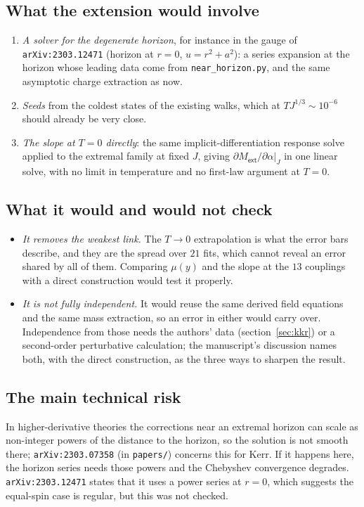 \documentclass[11pt,a4paper]{article}
\newcommand{\q}[1]{\subsection*{\color{accent}#1}}
\newcommand{\ext}{\mathsf{ext}}
\begin{document}
\q{What the extension would involve}

\begin{enumerate}\itemsep3pt
  \item \emph{A solver for the degenerate horizon}, for instance in the gauge of
  \texttt{arXiv:2303.12471} (horizon at $r=0$, $u=r^2+a^2$): a series expansion
  at the horizon whose leading data come from \texttt{near\_horizon.py}, and the
  same asymptotic charge extraction as now.
  \item \emph{Seeds} from the coldest states of the existing walks, which at
  $TJ^{1/3}\sim10^{-6}$ should already be very close.
  \item \emph{The slope at $T=0$ directly}: the same implicit-differentiation
  response solve applied to the extremal family at fixed $J$, giving
  $\partial M_\ext/\partial\alpha|_J$ in one linear solve, with no limit in
  temperature and no first-law argument at $T=0$.
\end{enumerate}

\q{What it would and would not check}

\begin{itemize}\itemsep3pt
  \item \emph{It removes the weakest link.} The $T\to0$ extrapolation is what
  the error bars describe, and they are the spread over $21$ fits, which cannot
  reveal an error shared by all of them. Comparing $\mu(y)$ and the slope at the
  $13$ couplings with a direct construction would test it properly.
  \item \emph{It is not fully independent.} It would reuse the same derived
  field equations and the same mass extraction, so an error in either would
  carry over. Independence from those needs the authors' data
  (section~\ref{sec:kkr}) or a second-order perturbative calculation; the
  manuscript's discussion names both, with the direct construction, as the
  three ways to sharpen the result.
\end{itemize}

\q{The main technical risk}

In higher-derivative theories the corrections near an extremal horizon can scale
as non-integer powers of the distance to the horizon, so the solution is not
smooth there; \texttt{arXiv:2303.07358} (in \texttt{papers/}) concerns this for
Kerr. If it happens here, the horizon series needs those powers and the
Chebyshev convergence degrades. \texttt{arXiv:2303.12471} states that it uses a
power series at $r=0$, which suggests the equal-spin case is regular, but this was
not checked.
\end{document}
